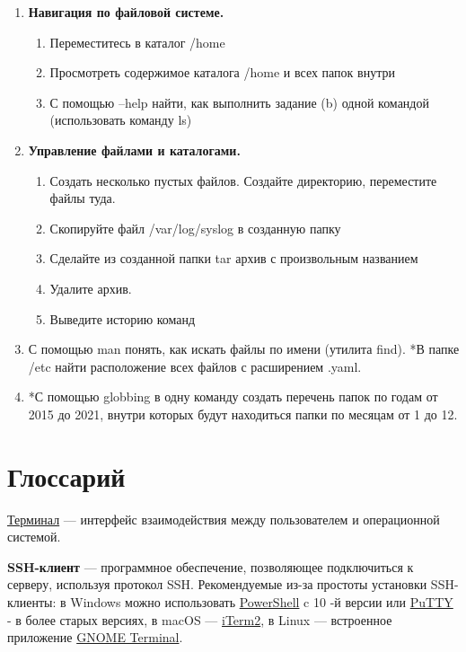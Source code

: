 \documentclass[14pt, a4paper]{article}
\begin{document}
\begin{enumerate}
    \item \textbf{Навигация по файловой системе.}
        \begin{enumerate}
            \item Переместитесь в каталог /home
            \item Просмотреть содержимое каталога /home и всех папок внутри
            \item С помощью --help найти, как выполнить задание (b) одной командой (использовать
            команду ls)
        \end{enumerate}
    \item \textbf{Управление файлами и каталогами.}
        \begin{enumerate}
            \item Создать несколько пустых файлов. Создайте директорию, переместите файлы туда.
            \item Скопируйте файл /var/log/syslog в созданную папку
            \item Сделайте из созданной папки tar архив с произвольным названием
            \item Удалите архив.
            \item Выведите историю команд
        \end{enumerate}
    \item С помощью man понять, как искать файлы по имени (утилита find).
    *В папке /etc найти расположение всех файлов с расширением .yaml.
    \item *С помощью globbing в одну команду создать перечень папок по годам от 2015 до 2021, внутри
    которых будут находиться папки по месяцам от 1 до 12.
\end{enumerate}


\section*{Глоссарий}
\href{https://ru.wikipedia.org/wiki/%D0%A2%D0%B5%D0%BA%D1%81%D1%82%D0%BE%D0%B2%D1%8B%D0%B9_%D0%B8%D0%BD%D1%82%D0%B5%D1%80%D1%84%D0%B5%D0%B9%D1%81_%D0%BF%D0%BE%D0%BB%D1%8C%D0%B7%D0%BE%D0%B2%D0%B0%D1%82%D0%B5%D0%BB%D1%8F}{Терминал} — интерфейс взаимодействия между пользователем и операционной системой.

\textbf{SSH-клиент} — программное обеспечение, позволяющее подключиться к серверу, используя протокол
SSH. Рекомендуемые из-за простоты установки SSH-клиенты: в Windows можно использовать
\href{https://www.howtogeek.com/336775/how-to-enable-and-use-windows-10s-built-in-ssh-commands/#:~:text=You can now use the,Windows PowerShell” from the menu}{PowerShell} c 10 -й версии или \href{https://www.putty.org/}{PuTTY} - в более старых версиях, в macOS — \href{https://iterm2.com/}{iTerm2}, в Linux —
встроенное приложение \href{https://help.ubuntu.ru/wiki/gnome_terminal}{GNOME Terminal}.
\end{document}
